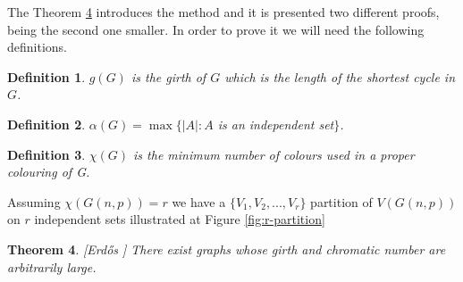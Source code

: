 \documentclass[12pt,twoside,a4paper,bibliography=totocnumbered]{book}
\numberwithin{equation}{section}
\newtheorem{theorem}             {Theorem}[section]
\newtheorem{definition}	[theorem] {Definition}
\theoremstyle{remark}
\begin{document}


The Theorem \ref{erdoss} introduces the method and it is presented two different proofs, being the second one smaller. In order to prove it we will need the following definitions.

\begin{definition}\label{def:girth}
$g(G)$ is the girth of $G$ which is the length of the shortest cycle in $G$. 
\end{definition}
\begin{definition}\label{def:independencenumber}
$\alpha(G) = \max\{|A|: A$ is an independent set$\}$.
\end{definition}
\begin{definition}\label{def:chromaticnumber}
$\chi(G)$ is the minimum number of colours used in a proper colouring of G.
\end{definition}
Assuming $\chi(G(n,p)) = r$ we have a $\{V_1,V_2,...,V_r\}$ partition of $V(G(n,p))$ on $r$ independent sets illustrated at Figure \ref{fig:r-partition}


\begin{theorem}\label{erdoss}[{Erd\H{o}s \cite{Er59}}] There exist graphs whose girth and chromatic number are arbitrarily large.
\end{theorem}
\end{document}
